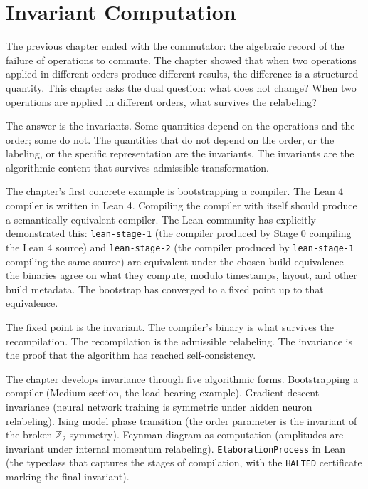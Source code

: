 \chapter{Invariant Computation}
\label{chap:invariant-computation}


\begin{chapteressay}

The previous chapter ended with the commutator: the algebraic record
of the failure of operations to commute. The chapter showed that
when two operations applied in different orders produce different
results, the difference is a structured quantity. This chapter asks
the dual question: what does not change? When two operations are
applied in different orders, what survives the relabeling?

The answer is the invariants. Some quantities depend on the
operations and the order; some do not. The quantities that do not
depend on the order, or the labeling, or the specific representation
are the invariants. The invariants are the algorithmic content that
survives admissible transformation.

The chapter's first concrete example is bootstrapping a compiler.
The Lean 4 compiler is written in Lean 4. Compiling the compiler
with itself should produce a semantically equivalent compiler.
The Lean community has explicitly demonstrated this:
\texttt{lean-stage-1} (the compiler produced by Stage 0 compiling
the Lean 4 source) and \texttt{lean-stage-2} (the compiler
produced by \texttt{lean-stage-1} compiling the same source) are
equivalent under the chosen build equivalence --- the binaries
agree on what they compute, modulo timestamps, layout, and other
build metadata. The bootstrap has converged to a fixed point up
to that equivalence.

The fixed point is the invariant. The compiler's binary is
what survives the recompilation. The recompilation is the
admissible relabeling. The invariance is the proof that the
algorithm has reached self-consistency.

The chapter develops invariance through five algorithmic forms.
Bootstrapping a compiler (Medium section, the load-bearing
example). Gradient descent invariance (neural network training
is symmetric under hidden neuron relabeling). Ising model phase
transition (the order parameter is the invariant of the broken
$\mathbb{Z}_2$ symmetry). Feynman diagram as computation
(amplitudes are invariant under internal momentum relabeling).
\texttt{ElaborationProcess} in Lean (the typeclass that captures
the stages of compilation, with the \texttt{HALTED} certificate
marking the final invariant).


\end{chapteressay}
